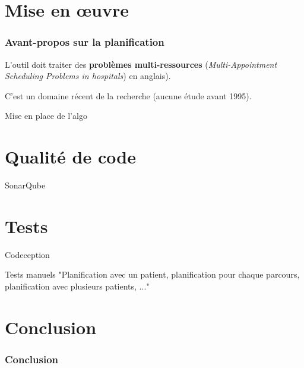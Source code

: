 \documentclass{beamer}
\begin{document}
\section{Mise en œuvre}

\begin{frame}
\frametitle{Avant-propos sur la planification}

L'outil doit traiter des \textbf{problèmes multi-ressources} (\textit{Multi-Appointment Scheduling Problems in hospitals}) en anglais).

C'est un domaine récent de la recherche (aucune étude avant 1995).



\end{frame}


Mise en place de l'algo


\section{Qualité de code}

SonarQube


\section{Tests}

Codeception


Tests manuels "Planification avec un patient, planification pour chaque parcours, planification avec plusieurs patients, ..."


\section*{Conclusion}

\begin{frame}
\frametitle{Conclusion}


\end{frame}
\end{document}
